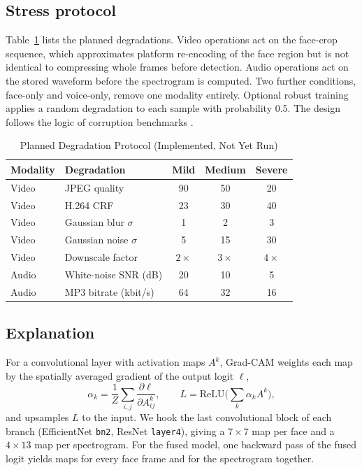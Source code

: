 \documentclass[conference]{IEEEtran}
\begin{document}
\subsection{Stress protocol}
Table~\ref{tab:degrade} lists the planned degradations. Video operations act on the face-crop sequence, which approximates platform re-encoding of the face region but is not identical to compressing whole frames before detection. Audio operations act on the stored waveform before the spectrogram is computed. Two further conditions, face-only and voice-only, remove one modality entirely. Optional robust training applies a random degradation to each sample with probability 0.5. The design follows the logic of corruption benchmarks \cite{hendrycks2019corruptions}.

\begin{table}[!t]
\caption{Planned Degradation Protocol (Implemented, Not Yet Run)}
\label{tab:degrade}
\centering
\small
\begin{tabular}{@{}llccc@{}}
\toprule
Modality & Degradation & Mild & Medium & Severe\\
\midrule
Video & JPEG quality & 90 & 50 & 20\\
Video & H.264 CRF & 23 & 30 & 40\\
Video & Gaussian blur $\sigma$ & 1 & 2 & 3\\
Video & Gaussian noise $\sigma$ & 5 & 15 & 30\\
Video & Downscale factor & $2\times$ & $3\times$ & $4\times$\\
Audio & White-noise SNR (dB) & 20 & 10 & 5\\
Audio & MP3 bitrate (kbit/s) & 64 & 32 & 16\\
\bottomrule
\end{tabular}
\end{table}

\subsection{Explanation}
For a convolutional layer with activation maps $A^{k}$, Grad-CAM \cite{selvaraju2017gradcam} weights each map by the spatially averaged gradient of the output logit $\ell$,
\begin{equation}
\alpha_k=\frac1Z\sum_{i,j}\frac{\partial \ell}{\partial A^{k}_{ij}},\qquad
L=\mathrm{ReLU}\Big(\sum_k\alpha_kA^{k}\Big),
\end{equation}
and upsamples $L$ to the input. We hook the last convolutional block of each branch (EfficientNet \texttt{bn2}, ResNet \texttt{layer4}), giving a $7\times7$ map per face and a $4\times13$ map per spectrogram. For the fused model, one backward pass of the fused logit yields maps for every face frame and for the spectrogram together.
\end{document}
